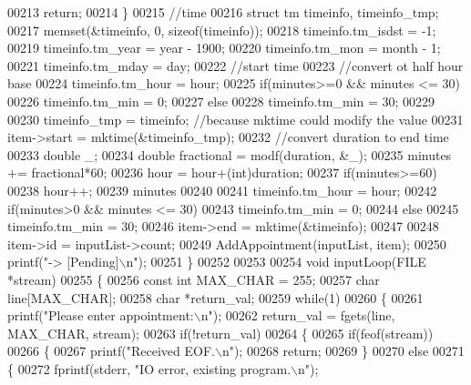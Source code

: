 \begin{DoxyCode}
{{{{{{{{00213         \textcolor{keywordflow}{return};
00214     \}
00215     \textcolor{comment}{//time}
00216     \textcolor{keyword}{struct }tm timeinfo, timeinfo\_tmp;
00217     memset(&timeinfo, 0, \textcolor{keyword}{sizeof}(timeinfo));
00218     timeinfo.tm\_isdst = -1;
00219     timeinfo.tm\_year = year - 1900;
00220     timeinfo.tm\_mon = month - 1;
00221     timeinfo.tm\_mday = day;
00222     \textcolor{comment}{//start time}
00223     \textcolor{comment}{//convert ot half hour base}
00224     timeinfo.tm\_hour = hour;
00225     \textcolor{keywordflow}{if}(minutes>=0 && minutes <= 30)
00226         timeinfo.tm\_min = 0;
00227     \textcolor{keywordflow}{else}
00228         timeinfo.tm\_min = 30;
00229 
00230     timeinfo\_tmp = timeinfo;    \textcolor{comment}{//because mktime could modify the value}
00231     item->start = mktime(&timeinfo\_tmp);
00232     \textcolor{comment}{//convert duration to end time}
00233     \textcolor{keywordtype}{double} \_;
00234     \textcolor{keywordtype}{double} fractional = modf(duration, &\_);
00235     minutes += fractional*60;
00236     hour = hour+(int)duration;
00237     \textcolor{keywordflow}{if}(minutes>=60)
00238         hour++;
00239     minutes %
00240 
00241     timeinfo.tm\_hour = hour;
00242     \textcolor{keywordflow}{if}(minutes>0 && minutes <= 30)
00243         timeinfo.tm\_min = 0;
00244     \textcolor{keywordflow}{else}
00245         timeinfo.tm\_min = 30;
00246     item->end = mktime(&timeinfo);
00247 
00248     item->id = inputList->count;
00249     AddAppointment(inputList, item);
00250     printf(\textcolor{stringliteral}{"-> [Pending]\(\backslash\)n"});
00251 \}
00252 
00253 
00254 \textcolor{keywordtype}{void} inputLoop(FILE *stream)
00255 \{
00256     \textcolor{keyword}{const} \textcolor{keywordtype}{int} MAX\_CHAR = 255;
00257     \textcolor{keywordtype}{char} line[MAX\_CHAR];
00258     \textcolor{keywordtype}{char} *return\_val;
00259     \textcolor{keywordflow}{while}(1)
00260     \{
00261         printf(\textcolor{stringliteral}{"Please enter appointment:\(\backslash\)n"});
00262         return\_val = fgets(line, MAX\_CHAR, stream);
00263         \textcolor{keywordflow}{if}(!return\_val)
00264         \{
00265             \textcolor{keywordflow}{if}(feof(stream))
00266             \{
00267                 printf(\textcolor{stringliteral}{"Received EOF.\(\backslash\)n"});
00268                 \textcolor{keywordflow}{return};
00269             \}
00270             \textcolor{keywordflow}{else}
00271             \{
00272                 fprintf(stderr, \textcolor{stringliteral}{"IO error, existing program.\(\backslash\)n"});
}}}}}}}}
\end{DoxyCode}
